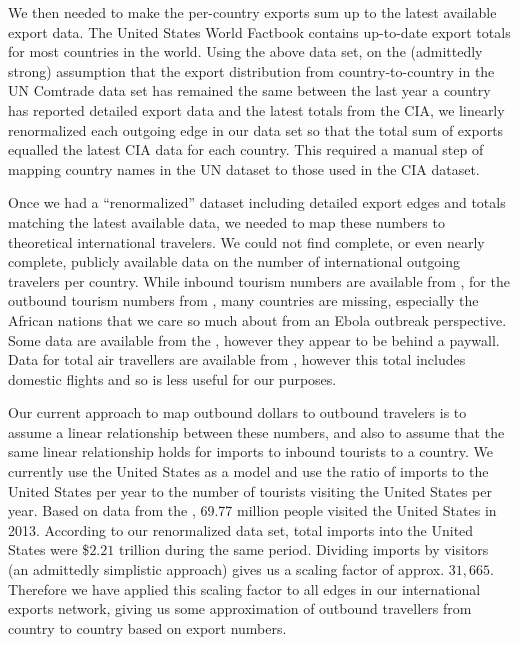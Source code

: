 \documentclass[10pt, journal,onecolumn]{IEEEtran}
\begin{document}
We then needed to make the per-country exports sum up to the latest available export data.
The United States \cite{ciatotalexports} World Factbook contains up-to-date export totals
for most countries in the world. Using the above data set, on the (admittedly strong) assumption
that the export distribution
from country-to-country in the UN Comtrade data set has remained the same between the last year a
country has reported detailed export data and the latest totals from the CIA, we linearly renormalized
each outgoing edge in our data set so that the total sum of exports equalled the latest CIA data
for each country.
This required a manual step of mapping country names in the UN dataset to those used in
the CIA dataset.

Once we had a ``renormalized'' dataset including detailed export edges and totals matching
the latest available data, we needed to map these numbers to theoretical international travelers.
We could not find complete, or even nearly complete, publicly available data on the number of
international outgoing travelers per country. While inbound tourism numbers are available from
\cite{worldbankinboundtourism}, for the outbound tourism numbers from \cite{worldbankoutboundtourism},
many countries are missing,
especially the African nations that we care so much about from an Ebola outbreak perspective.
Some data are available from the \cite{unwtooutboundtourism}, however they appear to be behind a paywall.
Data for total air travellers are available from \cite{worldbankairpassengers},
however this total includes domestic flights and so is less useful for our purposes.

Our current approach to map outbound dollars to outbound travelers is to assume a linear relationship
between these numbers, and also to assume that the same linear relationship holds for imports to
inbound tourists to a country.
We currently use the United States as a model and use the ratio of
imports to the United States per year to the number of tourists visiting the United States per year.
Based on data from the \cite{usinboundtourists}, 69.77 million people visited the United States in 2013.
According to our renormalized data set, total imports into the United States were
\$$2.21$ trillion during the same period. Dividing imports by visitors (an admittedly
simplistic approach) gives us a scaling factor of approx. $31,665$. Therefore we have applied this
scaling factor to all edges in our international exports network, giving us some approximation of
outbound travellers from country to country based on export numbers.
\end{document}
